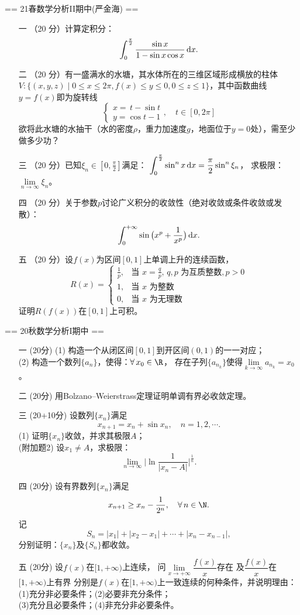 == 21春数学分析II期中(严金海) ==
\begin{itemize}
\item[一]（20 分）计算定积分：\[\int_0^\frac{\pi}{2}\frac{\sin x}{1-\sin x\cos x}\,{\rm d}x.\]
\item[二]（20 分）有一盛满水的水塘，其水体所在的三维区域形成横放的柱体
$V:\{(x,y,z) \mid 0 \le x \le 2\pi,f(x) \le y \le 0,0 \le z \le 1\}$，其中函数曲线$y=f(x)$即为旋转线
$$\begin{cases}x=\,t-\sin t\\ y=\cos t-1\end{cases}, \quad t\in[0,2\pi]$$
欲将此水塘的水抽干（水的密度$\rho$，重力加速度$g$，地面位于$y=0$处），需至少做多少功？
\item[三]（20 分）已知$\xi_n\in[0,\frac{\pi}{2}]$满足：
$\displaystyle \int_0^\frac{\pi}{2}\sin^nx\,{\rm d}x=\frac{\pi}{2}\sin^n\xi_n$，
求极限：$\lim\limits_{n\to\infty}\xi_n$。
\item[四]（20 分）关于参数$p$讨论广义积分的收敛性（绝对收敛或条件收敛或发散）：
\[\int_{0}^{+\infty}\sin\big(x^p+\frac{1}{x^p}\big)\,{\rm d}x.\]
\item[五]（20 分）设$f(x)$为区间$[0,1]$上单调上升的连续函数，
\[R(x)=\begin{cases}\frac{1}{p},&\text{当 }x=\frac{q}{p},\,q,p\text{ 为互质整数},p>0\\
1,&\text{当 }x\text{ 为整数}\\0,&\text{当 }x\text{ 为无理数}\end{cases}\]
证明$R(f(x))$在$[0,1]$上可积。
\end{itemize}

== 20秋数学分析I期中 ==
\begin{enumerate}
    \item[一] (20分) (1) 构造一个从闭区间$[0,1]$到开区间$(0,1)$的一一对应；\\
    (2) 构造一个数列$\{a_n\}$，使得：$\forall\, x_0\in\R$，
    存在子列$\{a_{n_k}\}$使得$\lim\limits_{k\to\infty}a_{n_k}=x_0$。
    \item[二] (20分) 用Bolzano--Weierstrass定理证明单调有界必收敛定理。
    \item[三] (20+10分) 设数列$\{x_n\}$满足
    \[x_{n+1}=x_n+\sin x_n, \quad n=1,2,\cdots.\]
    (1) 证明$\{x_n\}$收敛，并求其极限$A$；\\
    (附加题2) 设$x_1 \ne A$，求极限：
    \[\lim_{n\to\infty}\bigg|\ln\frac{1}{|x_n-A|}\bigg|^\frac{1}{n}.\]
    \item[四] (20分) 设有界数列$\{x_n\}$满足
    \[x_{n+1} \ge x_n-\frac{1}{2^n}, \quad \forall\, n\in\N.\]
    记\[S_n=|x_1|+|x_2-x_1|+\cdots+|x_n-x_{n-1}|,\]
    分别证明：$\{x_n\}$及$\{S_n\}$都收敛。
    \item[五] (20分) 设$f(x)$在$[1,+\infty)$上连续，
    问$\lim\limits_{x\to+\infty}\dfrac{f(x)}{x}$存在
    及$\dfrac{f(x)}{x}$在$[1,+\infty)$上有界
    分别是$f(x)$在$[1,+\infty)$上一致连续的何种条件，并说明理由：\\
    (1)充分非必要条件；\quad(2)必要非充分条件；\\
    (3)充分且必要条件；\quad(4)非充分非必要条件。
\end{enumerate}

